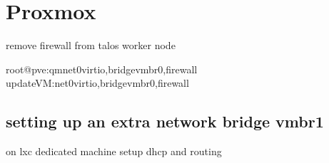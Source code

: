 \documentclass[letterpaper,10pt,english]{sphinxmanual}
\begin{document}
\sphinxstepscope


\chapter{Proxmox}
\label{\detokenize{cluster:proxmox}}\label{\detokenize{cluster::doc}}
\sphinxAtStartPar
remove firewall from talos worker node

\begin{sphinxVerbatim}[commandchars=\\\{\}]
root@pve:\PYGZti{}\PYGZsh{}qm\PYGZhy{}net0virtio,bridgevmbr0,firewall
updateVM:\PYGZhy{}net0virtio,bridgevmbr0,firewall
\end{sphinxVerbatim}


\section{setting up an extra network bridge vmbr1}
\label{\detokenize{cluster:setting-up-an-extra-network-bridge-vmbr1}}
\sphinxAtStartPar
on lxc dedicated machine setup dhcp and routing
\end{document}

